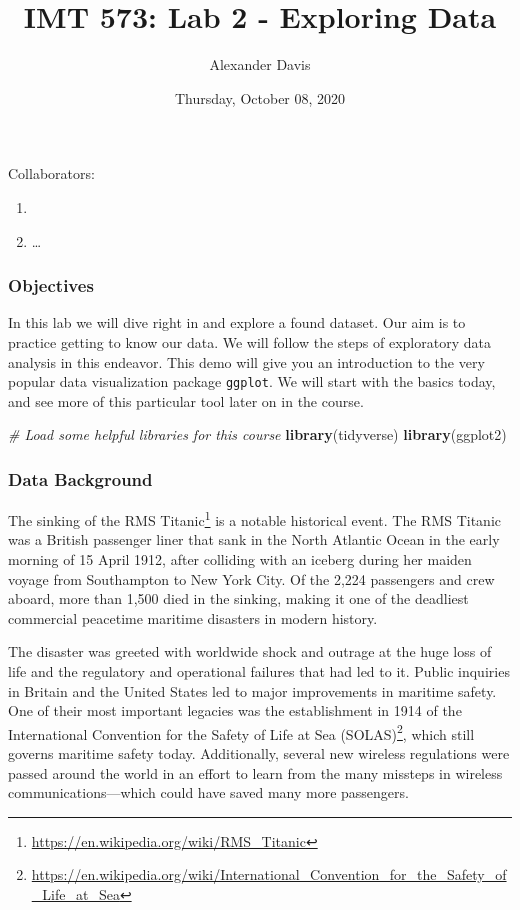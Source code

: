 \documentclass[
]{article}
\title{IMT 573: Lab 2 - Exploring Data}
\author{Alexander Davis}
\date{Thursday, October 08, 2020}
\newenvironment{Shaded}{\begin{snugshade}}{\end{snugshade}}
\newcommand{\CommentTok}[1]{\textcolor[rgb]{0.56,0.35,0.01}{\textit{#1}}}
\newcommand{\KeywordTok}[1]{\textcolor[rgb]{0.13,0.29,0.53}{\textbf{#1}}}
\newcommand{\NormalTok}[1]{#1}
\begin{document}
\maketitle

Collaborators:

\begin{enumerate}
\def\labelenumi{\arabic{enumi}.}
\item
\item
  \ldots{}
\end{enumerate}

\hypertarget{objectives}{%
\subsubsection{Objectives}\label{objectives}}

In this lab we will dive right in and explore a found dataset. Our aim
is to practice getting to know our data. We will follow the steps of
exploratory data analysis in this endeavor. This demo will give you an
introduction to the very popular data visualization package
\texttt{ggplot}. We will start with the basics today, and see more of
this particular tool later on in the course.

\begin{Shaded}
\begin{Highlighting}[]
\CommentTok{# Load some helpful libraries for this course}
\KeywordTok{library}\NormalTok{(tidyverse)}
\KeywordTok{library}\NormalTok{(ggplot2)}
\end{Highlighting}
\end{Shaded}

\hypertarget{data-background}{%
\subsubsection{Data Background}\label{data-background}}

The sinking of the RMS Titanic\footnote{\url{https://en.wikipedia.org/wiki/RMS_Titanic}}
is a notable historical event. The RMS Titanic was a British passenger
liner that sank in the North Atlantic Ocean in the early morning of 15
April 1912, after colliding with an iceberg during her maiden voyage
from Southampton to New York City. Of the 2,224 passengers and crew
aboard, more than 1,500 died in the sinking, making it one of the
deadliest commercial peacetime maritime disasters in modern history.

The disaster was greeted with worldwide shock and outrage at the huge
loss of life and the regulatory and operational failures that had led to
it. Public inquiries in Britain and the United States led to major
improvements in maritime safety. One of their most important legacies
was the establishment in 1914 of the International Convention for the
Safety of Life at Sea (SOLAS)\footnote{\url{https://en.wikipedia.org/wiki/International_Convention_for_the_Safety_of_Life_at_Sea}},
which still governs maritime safety today. Additionally, several new
wireless regulations were passed around the world in an effort to learn
from the many missteps in wireless communications---which could have
saved many more passengers.
\end{document}
